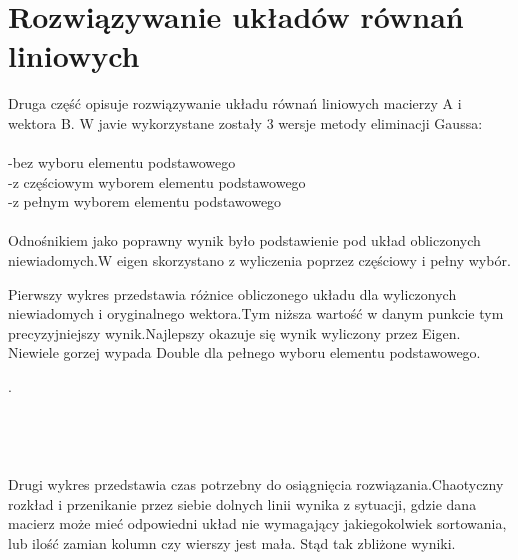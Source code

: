 \documentclass[8pt]{article}
\begin{document}
\section{Rozwiązywanie układów równań liniowych}
Druga część opisuje rozwiązywanie układu równań liniowych macierzy A i wektora B.
W javie wykorzystane zostały 3 wersje metody eliminacji Gaussa:\\
\\
-bez wyboru elementu podstawowego\\
-z częściowym wyborem elementu podstawowego\\
-z pełnym wyborem elementu podstawowego\\
\\
Odnośnikiem jako poprawny wynik było podstawienie pod układ obliczonych niewiadomych.W eigen skorzystano z wyliczenia poprzez częściowy i pełny wybór.

Pierwszy wykres przedstawia różnice obliczonego układu dla wyliczonych niewiadomych i oryginalnego wektora.Tym niższa wartość w danym punkcie tym precyzyjniejszy wynik.Najlepszy okazuje się wynik wyliczony przez Eigen. Niewiele gorzej wypada Double dla pełnego wyboru elementu podstawowego.


\begin{center}
\end{center}

.\\
\\
\\
\\
\\Drugi wykres przedstawia czas potrzebny do osiągnięcia rozwiązania.Chaotyczny rozkład i przenikanie przez siebie dolnych linii wynika z sytuacji, gdzie dana macierz może mieć odpowiedni układ nie wymagający jakiegokolwiek sortowania, lub ilość zamian kolumn czy wierszy jest mała. Stąd tak zbliżone wyniki.\\
\end{document}
